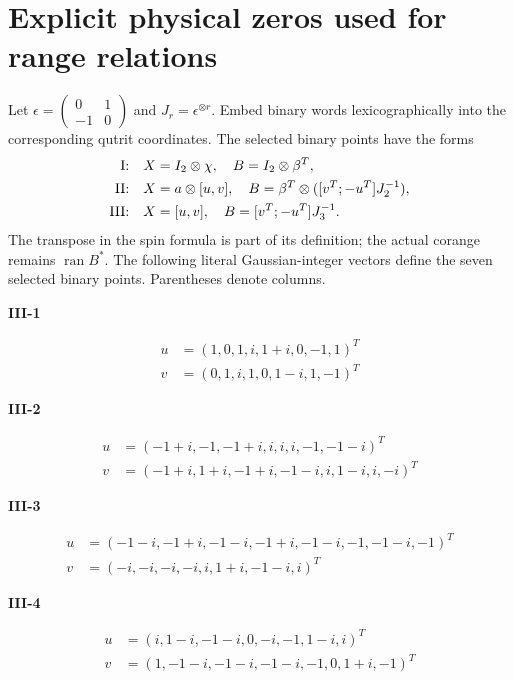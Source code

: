\documentclass[11pt,a4paper]{article}
\theoremstyle{definition}\newtheorem{definition}[theorem]{Definition}
\theoremstyle{remark}\newtheorem{remark}[theorem]{Remark}
\DeclareMathOperator{\ran}{ran}\DeclareMathOperator{\vecop}{vec}
\numberwithin{equation}{section}
\begin{document}
\section{Explicit physical zeros used for range relations}\label{app:zeros}
Let
$\epsilon=\begin{pmatrix}0&1\\-1&0\end{pmatrix}$ and
$J_r=\epsilon^{\otimes r}$.
Embed binary words lexicographically into the corresponding qutrit
coordinates. The selected binary points have the forms
\begin{align}
\text{I:}\quad&
 X=I_2\otimes\chi,\quad B=I_2\otimes\beta^T,\notag\\
\text{II:}\quad&
 X=a\otimes[u,v],\quad
 B=\beta^T\otimes([v^T;-u^T]J_2^{-1}),\notag\\
\text{III:}\quad&
 X=[u,v],\quad B=[v^T;-u^T]J_3^{-1}.
\label{eq:zerofamilies}
\end{align}
The transpose in the spin formula is part of its definition;
the actual corange remains $\ran B^*$.
The following literal Gaussian-integer vectors define the seven
selected binary points. Parentheses denote columns.

\begingroup\small

\noindent\textbf{III-1}\par
\begin{align*}
u&=(1,0,1,i,1 + i,0,-1,1)^T\\
v&=(0,1,i,1,0,1 - i,1,-1)^T
\end{align*}

\noindent\textbf{III-2}\par
\begin{align*}
u&=(-1 + i,-1,-1 + i,i,i,i,-1,-1 - i)^T\\
v&=(-1 + i,1 + i,-1 + i,-1 - i,i,1 - i,i,- i)^T
\end{align*}

\noindent\textbf{III-3}\par
\begin{align*}
u&=(-1 - i,-1 + i,-1 - i,-1 + i,-1 - i,-1,-1 - i,-1)^T\\
v&=(- i,- i,- i,- i,i,1 + i,-1 - i,i)^T
\end{align*}

\noindent\textbf{III-4}\par
\begin{align*}
u&=(i,1 - i,-1 - i,0,- i,-1,1 - i,i)^T\\
v&=(1,-1 - i,-1 - i,-1 - i,-1,0,1 + i,-1)^T
\end{align*}
\end{document}
